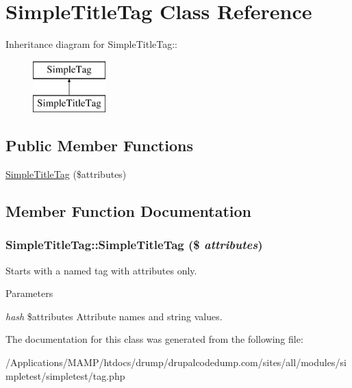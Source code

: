 \hypertarget{class_simple_title_tag}{
\section{SimpleTitleTag Class Reference}
\label{class_simple_title_tag}
}
Inheritance diagram for SimpleTitleTag::\begin{figure}[H]
\begin{center}
\leavevmode
\includegraphics[height=2cm]{class_simple_title_tag}
\end{center}
\end{figure}
\subsection*{Public Member Functions}
\begin{DoxyCompactItemize}
\item 
\hyperlink{class_simple_title_tag_a88890911d2dda3ef599b52a39b662880}{SimpleTitleTag} (\$attributes)
\end{DoxyCompactItemize}


\subsection{Member Function Documentation}
\hypertarget{class_simple_title_tag_a88890911d2dda3ef599b52a39b662880}{
\subsubsection[{SimpleTitleTag}]{\setlength{\rightskip}{0pt plus 5cm}SimpleTitleTag::SimpleTitleTag (\$ {\em attributes})}}
\label{class_simple_title_tag_a88890911d2dda3ef599b52a39b662880}
Starts with a named tag with attributes only. 
\begin{DoxyParams}{Parameters}
\item[{\em hash}]\$attributes Attribute names and string values. \end{DoxyParams}


The documentation for this class was generated from the following file:\begin{DoxyCompactItemize}
\item 
/Applications/MAMP/htdocs/drump/drupalcodedump.com/sites/all/modules/simpletest/simpletest/tag.php\end{DoxyCompactItemize}
